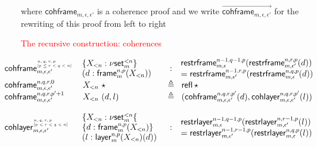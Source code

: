 \documentclass[12pt,landscape]{article}
\newcommand{\refl}[1]{\mathsf{refl}\,{#1}}
\newcommand{\defeq}{\triangleq}
\newcommand{\partialcubset}[2]{\mathsf{\nu set}_{#1}^{<#2}}
\newcommand{\mybox}[1]{\mathsf{frame}_{#1}}
\newcommand{\mylayer}[1]{\mathsf{layer}_{#1}}
\newcommand{\unitpoint}{\star}
\newcommand{\downbox}[2]{\mathsf{restrframe}_{#1,#2}}
\newcommand{\downlayer}[2]{\mathsf{restrlayer}_{#1,#2}}
\newcommand{\cohbox}[2]{\mathsf{cohframe}_{#1,#2}}
\newcommand{\cohlayer}[2]{\mathsf{cohlayer}_{#1,#2}}
\begin{document}
\begin{Large}
\begin{sf}
\noindent where $\cohbox{m}{\epsilon,\epsilon'}$ is a coherence proof and we
write $\overrightarrow{\cohbox{m}{\epsilon,\epsilon'}}$ for the
  rewriting of this proof from left to right

\newpage

\begin{center}
\textcolor{red}{\huge The recursive construction: coherences}
\end{center}

$$
\begin{large}\hspace{-1cm}
\begin{array}{llcl}
\cohbox{m}{\epsilon,\epsilon'}^{\!\!\!\tiny\begin{array}{l}n,q,r,p\\\mbox{}[p \leq r < q < n]\end{array}} & \!\!\!\begin{array}{l}\{X_{<n}:\partialcubset{m}{n}\}\\(d:\mybox{m}^{n,p}(X_{<n}))\end{array}& : & \!\!\!\begin{array}{ll}\downbox{m}{\epsilon}^{n-1,q-1,p}(\downbox{m}{\epsilon'}^{n,r,p}(d)) \\ = \downbox{m}{\epsilon'}^{n-1,r,p}(\downbox{m}{\epsilon}^{n,q,p}(d))\end{array}\\
\cohbox{m}{\epsilon,\epsilon'}^{n,q,r,0} & X_{<n}~\unitpoint & \defeq & \refl{\unitpoint}\\
\cohbox{m}{\epsilon,\epsilon'}^{n,q,r,p'+1} & X_{<n}~(d,l) & \defeq & (\cohbox{m}{\epsilon,\epsilon'}^{n,q,r,p'}(d),\cohlayer{m}{\epsilon,\epsilon'}^{n,q,r,p'}(l))\\
\\
\cohlayer{m}{\epsilon,\epsilon'}^{\!\!\!\tiny\begin{array}{l}n,q,r,p\\\mbox{}[p < r < q < n]\end{array}} & \!\!\!\begin{array}{l}\{X_{<n}:\partialcubset{m}{n}\{\\\{d:\mybox{m}^{n,p}(X_{<n})\}\\(l:\mylayer{m}^{n,p}(X_{<n})(d))\end{array}& : & \!\!\!\begin{array}{ll}\downlayer{m}{\epsilon}^{n-1,q-1,p}(\downlayer{m}{\epsilon'}^{n,r-1,p}(l)) \\ = \downlayer{m}{\epsilon'}^{n-1,r-1,p}(\downlayer{m}{\epsilon}^{n,q,p}(l))\end{array}\\

\end{array}
\end{large}$$
\end{sf}
\end{Large}
\end{document}
